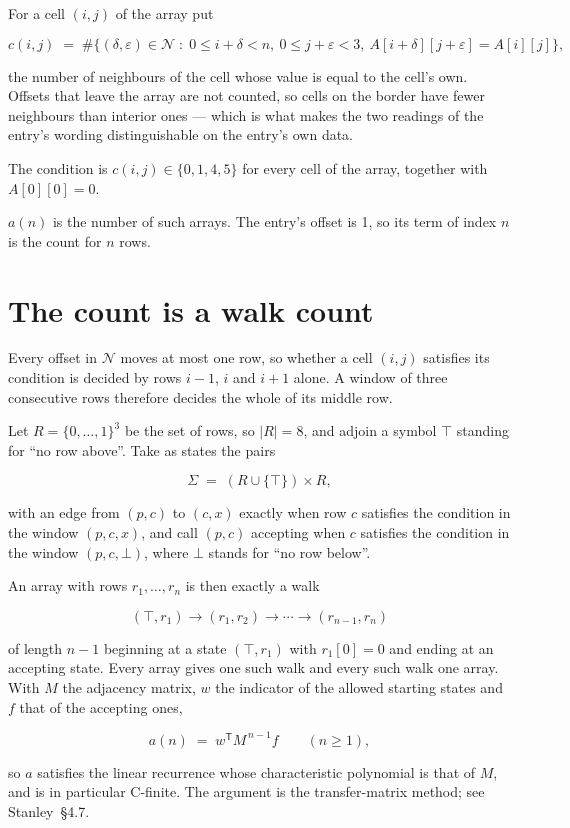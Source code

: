 \documentclass[11pt]{article}
\theoremstyle{definition}
\begin{document}
For a cell $(i,j)$ of the array put

\[c(i,j) \;=\; \#\bigl\{(\delta,\varepsilon)\in\mathcal{N} \;:\; 0\le i+\delta<n,\ 0\le j+\varepsilon<3,\ A[i+\delta][j+\varepsilon] = A[i][j]\bigr\},\]

the number of neighbours of the cell whose value is equal to the cell's own. Offsets that leave the array are not counted, so cells on the border have fewer neighbours than interior ones --- which is what makes the two readings of the entry's wording distinguishable on the entry's own data.

The condition is $c(i,j) \in \{0, 1, 4, 5\}$ for every cell of the array, together with $A[0][0]=0$.

$a(n)$ is the number of such arrays. The entry's offset is 1, so its term of index $n$ is the count for $n$ rows.

\section{The count is a walk count}

Every offset in $\mathcal{N}$ moves at most one row, so whether a cell $(i,j)$ satisfies its condition is decided by rows $i-1$, $i$ and $i+1$ alone. A window of three consecutive rows therefore decides the whole of its middle row.

Let $R = \{0,\dots,1\}^{3}$ be the set of rows, so $|R| = 8$, and adjoin a symbol $\top$ standing for ``no row above''. Take as states the pairs

\[\Sigma \;=\; (R \cup \{\top\}) \times R,\]

with an edge from $(p,c)$ to $(c,x)$ exactly when row $c$ satisfies the condition in the window $(p,c,x)$, and call $(p,c)$ accepting when $c$ satisfies the condition in the window $(p,c,\bot)$, where $\bot$ stands for ``no row below''.

An array with rows $r_1,\dots,r_n$ is then exactly a walk

\[(\top,r_1) \to (r_1,r_2) \to \cdots \to (r_{n-1},r_n)\]

of length $n-1$ beginning at a state $(\top,r_1)$ with $r_1[0]=0$ and ending at an accepting state. Every array gives one such walk and every such walk one array. With $M$ the adjacency matrix, $w$ the indicator of the allowed starting states and $f$ that of the accepting ones,

\[a(n) \;=\; w^{\mathsf T} M^{\,n-1} f \qquad (n \ge 1),\]

so $a$ satisfies the linear recurrence whose characteristic polynomial is that of $M$, and is in particular C-finite. The argument is the transfer-matrix method; see Stanley~\S4.7.
\end{document}
